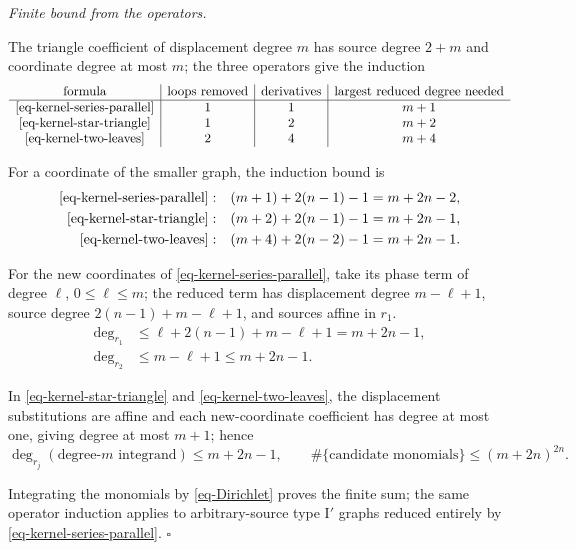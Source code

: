 \documentclass[11pt]{article}
\numberwithin{equation}{section}
\numberwithin{figure}{section}
\numberwithin{table}{section}
\begin{document}
\begin{proofbox}
\emph{Finite bound from the operators.}

The triangle coefficient of displacement degree $m$ has source degree $2+m$ and coordinate degree at most $m$; the three operators give the induction
\begin{equation*}
\begin{array}{c|c|c|c}
\text{formula}&\text{loops removed}&\text{derivatives}&
\text{largest reduced degree needed}\\\hline
\text{\eqref{eq-kernel-series-parallel}}&1&1&m+1\\
\text{\eqref{eq-kernel-star-triangle}}&1&2&m+2\\
\text{\eqref{eq-kernel-two-leaves}}&2&4&m+4
\end{array}
\end{equation*}

For a coordinate of the smaller graph, the induction bound is
\begin{equation*}
\begin{aligned}
\text{\eqref{eq-kernel-series-parallel}}:\quad &(m+1)+2(n-1)-1=m+2n-2,\\
\text{\eqref{eq-kernel-star-triangle}}:\quad &(m+2)+2(n-1)-1=m+2n-1,\\
\text{\eqref{eq-kernel-two-leaves}}:\quad &(m+4)+2(n-2)-1=m+2n-1.
\end{aligned}
\end{equation*}

For the new coordinates of \eqref{eq-kernel-series-parallel}, take its phase term of degree $\ell$, $0\le\ell\le m$; the reduced term has displacement degree $m-\ell+1$, source degree $2(n-1)+m-\ell+1$, and sources affine in $r_1$.
\begin{equation*}
\begin{aligned}
\deg_{r_1}&\le\ell+2(n-1)+m-\ell+1=m+2n-1,\\
\deg_{r_2}&\le m-\ell+1\le m+2n-1.
\end{aligned}
\end{equation*}

In \eqref{eq-kernel-star-triangle} and \eqref{eq-kernel-two-leaves}, the displacement substitutions are affine and each new-coordinate coefficient has degree at most one, giving degree at most $m+1$; hence
\begin{equation*}
\deg_{r_j}(\text{degree-}m\text{ integrand})\le m+2n-1,
\qquad
\#\{\text{candidate monomials}\}\le(m+2n)^{2n}.
\end{equation*}

Integrating the monomials by \eqref{eq-Dirichlet} proves the finite sum; the same operator induction applies to arbitrary-source type I$\prime$ graphs reduced entirely by \eqref{eq-kernel-series-parallel}. $\square$
\end{proofbox}
\end{document}
